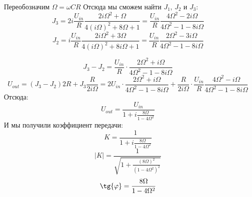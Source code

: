 Переобозначим $\Omega=\omega CR$
Отсюда мы сможем найти $J_1$, $J_2$ и $J_3$:
\begin{equation}
	J_3=2i\frac{U_{in}}{R}\frac{2i\Omega^2+\Omega}{4(i\Omega)^2+8\Omega+1}=\frac{U_{in}}{R}\frac{4\Omega^2-2i\Omega }{4\Omega^2-1-8i\Omega}
\end{equation}
\begin{equation}
	J_2=i\frac{U_{in}}{R}\frac{2i\Omega^2 +3\Omega}{4(i\Omega)^2+8i\Omega+1}=\frac{U_{in}}{R}\frac{2\Omega^2-3i\Omega}{4\Omega^2-1-8i\Omega}
\end{equation}


\begin{equation}
	J_3-J_2=\frac{U_{in}}{R}\cdot\frac{2\Omega^2 +i\Omega }{4\Omega^2-1-8i\Omega}
\end{equation}
\begin{equation}
	U_{out}=(J_3-J_2)2R+J_3\frac{R}{2i\Omega}=2U_{in}
		\cdot\frac{2\Omega^2+i\Omega}
								{4\Omega^2-1-8i\Omega}+
			\frac{R}{2i\Omega}\cdot \frac
			{U_{in}}{R}\frac{4\Omega^2-i\Omega}
								{4\Omega^2-1-8i\Omega}
	\end{equation}
	Отсюда:
	\begin{equation}
		U_{out}=\frac{U_{in}}{1+i\frac{8\Omega}{1-4\Omega^2}}
	\end{equation}
	И мы получили коэффициент передачи:
	\begin{equation}
		K=\frac{1}{1+i\frac{8\Omega}{1-4\Omega^2}}
	\end{equation}
	\begin{equation}
		|K|=\frac{1}{\sqrt{1+\frac{(8\Omega)^2}{(1-4\Omega^2)^2}}}
	\end{equation}
	\begin{equation}
		\tg{\phi}=\frac{8\Omega}{1-4\Omega^2}
	\end{equation}



